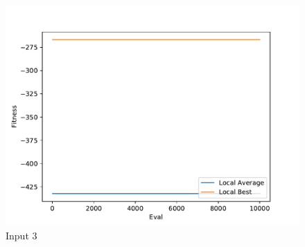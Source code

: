 \documentclass{standalone}
\begin{document}
\begin{figure}[!htb]
	\caption{Input 3}
	\label{fig:graph_3022}
	\includegraphics[width=\textwidth]{../graphs/graphs/3022.pdf}
\end{figure}
\end{document}

